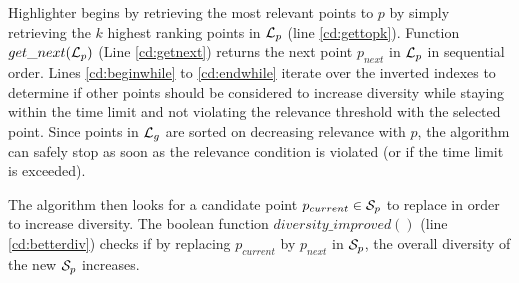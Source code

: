 {\sc Highlighter} begins by retrieving the most relevant points to $p$ by simply retrieving the $k$ highest ranking points in ${\cal L}_p$ (line \ref{cd:gettopk}). Function $get\_next({\cal L}_p)$ (Line \ref{cd:getnext}) returns the next point $p_{next}$ in ${\cal L}_p$ in sequential order. Lines \ref{cd:beginwhile} to \ref{cd:endwhile} iterate over the inverted indexes to determine if other points should be considered to increase diversity while staying within the time limit and not violating the relevance threshold with the selected point. Since points in ${\cal L}_g$ are sorted on decreasing relevance with $p$, the algorithm can safely stop as soon as the relevance condition is violated (or if the time limit is exceeded).

The algorithm then looks for a candidate point $p_{current} \in {\cal S}_p$ to replace in order to increase diversity. The boolean function $\mathit{diversity\_improved}()$ (line \ref{cd:betterdiv}) checks if by replacing $p_{current}$ by $p_{next}$ in ${\cal S}_p$, the overall diversity of the new ${\cal S}_p$ increases.

